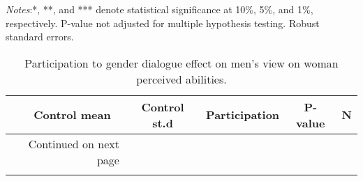 \documentclass[10pt,a4paper, margin=1in]{article}
\begin{document}
\begin{center}
	{\tiny \tabcolsep=1pt  %
		\begin{ThreePartTable}
			\begin{TableNotes}[flushleft]
				\tiny
				\item \textit{Notes}:*, **, and *** denote statistical significance at 10\%, 5\%, and 1\%, respectively. P-value not adjusted for multiple hypothesis testing. Robust standard errors.
			\end{TableNotes}
			\begin{longtable}{l*{5}{c}}
				\caption{Participation to gender dialogue effect on men's view on woman perceived abilities.}\label{tab:balance_omni}					\\
				\toprule
				\hline 
				&\multicolumn{1}{p{1cm}}{\centering Control mean}
				&\multicolumn{1}{p{1cm}}{\centering Control st.d}
				&\multicolumn{1}{p{2cm}}{\centering Participation}
				&\multicolumn{1}{p{1cm}}{\centering P-value}
				&\multicolumn{1}{p{1cm}}{\centering N} \\
				\hline 
				\endfirsthead
				\hline
				\endhead
				\hline
				\multicolumn{2}{r}{{Continued on next page}} \\
				\endfoot
				
				\bottomrule
				\insertTableNotes
				\endlastfoot
				
			\end{longtable}
		\end{ThreePartTable}
	}
\end{center}
\end{document}
